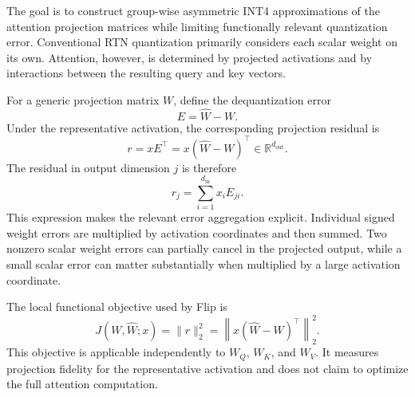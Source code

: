 The goal is to construct group-wise asymmetric INT4 approximations of the attention projection matrices while limiting functionally relevant quantization error. Conventional RTN quantization primarily considers each scalar weight on its own. Attention, however, is determined by projected activations and by interactions between the resulting query and key vectors.

For a generic projection matrix $W$, define the dequantization error
\begin{equation}
E=\hat W-W.
\end{equation}
Under the representative activation, the corresponding projection residual is
\begin{equation}
r=xE^\top=x(\hat W-W)^\top
\in\mathbb{R}^{d_{\mathrm{out}}}.
\end{equation}
The residual in output dimension $j$ is therefore
\begin{equation}
r_j=\sum_{i=1}^{d_{\mathrm{in}}}x_iE_{ji}.
\end{equation}
This expression makes the relevant error aggregation explicit. Individual signed weight errors are multiplied by activation coordinates and then summed. Two nonzero scalar weight errors can partially cancel in the projected output, while a small scalar error can matter substantially when multiplied by a large activation coordinate.

The local functional objective used by Flip is
\begin{equation}
J(W,\hat W;x)=\|r\|_2^2
=\left\|x(\hat W-W)^\top\right\|_2^2.
\end{equation}
This objective is applicable independently to $W_Q$, $W_K$, and $W_V$. It measures projection fidelity for the representative activation and does not claim to optimize the full attention computation.

